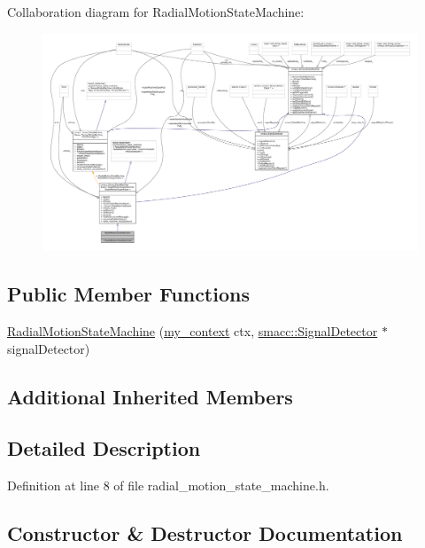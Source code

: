 Collaboration diagram for Radial\+Motion\+State\+Machine\+:
\nopagebreak
\begin{figure}[H]
\begin{center}
\leavevmode
\includegraphics[width=350pt]{structRadialMotionStateMachine__coll__graph}
\end{center}
\end{figure}
\subsection*{Public Member Functions}
\begin{DoxyCompactItemize}
\item 
\hyperlink{structRadialMotionStateMachine_a12cf027525d4111f6825e7c7083f9ada}{Radial\+Motion\+State\+Machine} (\hyperlink{common_8h_af2dcacead80d69b96952496fe413bbfe}{my\+\_\+context} ctx, \hyperlink{classsmacc_1_1SignalDetector}{smacc\+::\+Signal\+Detector} $\ast$signal\+Detector)
\end{DoxyCompactItemize}
\subsection*{Additional Inherited Members}


\subsection{Detailed Description}


Definition at line 8 of file radial\+\_\+motion\+\_\+state\+\_\+machine.\+h.



\subsection{Constructor \& Destructor Documentation}
